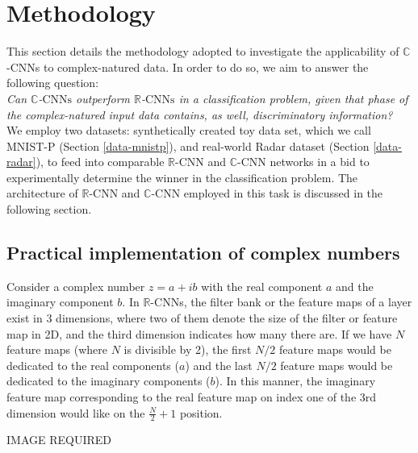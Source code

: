 \chapter{Methodology} \label{chap:methodology}
 
This section details the methodology adopted to investigate the applicability of $\mathbb{C}$-CNNs to complex-natured data. In order to do so, we aim to answer the following question:\\
 
 \textit{Can $\mathbb{C}$-$\mathrm{CNNs}$ outperform $\mathbb{R}$-$\mathrm{CNNs}$ in a classification problem, given that phase of the complex-natured input data contains, as well, discriminatory information?}\\
 
 We employ two datasets: synthetically created toy data set, which we call MNIST-P (Section \ref{data-mnistp}), and real-world Radar dataset (Section \ref{data-radar}), to feed into comparable $\mathbb{R}$-CNN and $\mathbb{C}$-CNN networks in a bid to experimentally determine the winner in the classification problem. The architecture of $\mathbb{R}$-CNN and $\mathbb{C}$-CNN employed in this task is discussed in the following section.
   
 \section{Practical implementation of complex numbers}
 Consider a complex number $z=a+ib$ with the real component $a$ and the imaginary component $b$. In $\mathbb{R}$-CNNs, the filter bank or the feature maps of a layer exist in 3 dimensions, where two of them denote the size of the filter or feature map in 2D, and the third dimension indicates how many there are. If we have $N$ feature maps (where $N$ is divisible by 2), the first $N/2$ feature maps would be dedicated to the real components ($a$) and the last $N/2$ feature maps would be dedicated to the imaginary components ($b$). In this manner, the imaginary feature map corresponding to the real feature map on index one of the 3rd dimension would like on the $\frac{N}{2} +1$ position.
 
 IMAGE REQUIRED
 
 
 
 
